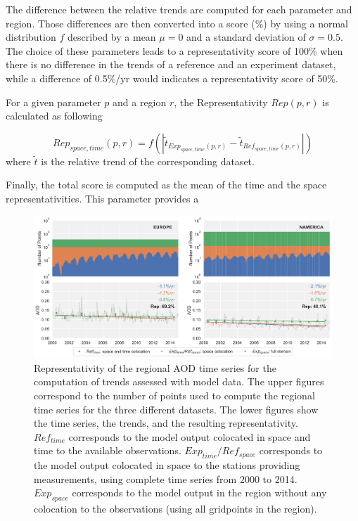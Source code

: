 \documentclass[journal abbreviation, manuscript]{copernicus}
\begin{document}
The difference between the relative trends are computed for each parameter and region. Those differences are then converted into a score (\unit{\%}) by using a normal distribution $f$ described by a mean $\mu=0$ and a standard deviation of $\sigma=0.5$. The choice of these parameters leads to a representativity score of 100\% when there is no difference in the trends of a reference and an experiment dataset, while a difference of 0.5\%/yr would indicates a representativity score of 50\%.

For a given parameter $p$ and a region $r$, the Representativity $Rep(p,r)$ is calculated as following

\begin{equation}
 Rep_{space,time}(p, r) = {f\left(\left| \tilde{t}_{Exp_{space,time}(p, r)}-\tilde{t}_{Ref_{space,time}(p, r)} \right|\right)}
\end{equation}
where $\tilde{t}$ is the relative trend of the corresponding dataset.

Finally, the total score is computed as the mean of the time and the space representativities. This parameter provides a

\begin{figure}[t]
 \includegraphics[width=16cm]{../scripts/figs/representativity-od550aer.png}
 \caption{Representativity of the regional AOD time series for the computation of trends assessed with model data. The upper figures correspond to the number of points used to compute the regional time series for the three different datasets. The lower figures show the time series, the trends, and the resulting representativity. $Ref_{time}$ corresponds to the model output colocated in space and time to the available observations. $Exp_{time}/Ref_{space}$ corresponds to the model output colocated in space to the stations providing measurements, using complete time series from 2000 to 2014. $Exp_{space}$ corresponds to the model output in the region without any colocation to the observations (using all gridpoints in the region).}
 \label{fig:representativity}
\end{figure}
\end{document}
